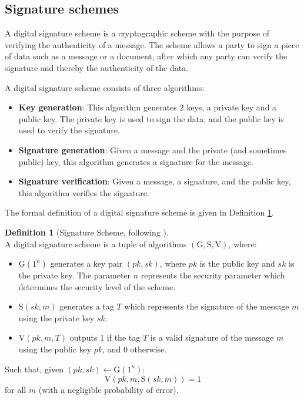 \documentclass[11pt,a4paper]{report}
\theoremstyle{definition}
\newtheorem{definition}{Definition}[section]
\begin{document}
\subsection{Signature schemes}
\label{sec:signatureschemes}
A digital signature scheme is a cryptographic scheme with the purpose of verifying the authenticity of a message. The scheme allows a party to sign a piece of data such as a message or a document, after which any party can verify the signature and thereby the authenticity of the data.

A digital signature scheme consists of three algorithms:
\begin{itemize}
  \item \textbf{Key generation}: This algorithm generates 2 keys, a private key and a public key. The private key is used to sign the data, and the public key is used to verify the signature.
  \item \textbf{Signature generation}: Given a message and the private (and sometimes public) key, this algorithm generates a signature for the message.
  \item \textbf{Signature verification}: Given a message, a signature, and the public key, this algorithm verifies the signature.
\end{itemize}
The formal definition of a digital signature scheme is given in Definition \ref{def:signaturescheme}.

\begin{definition}[Signature Scheme, following \cite{goldwasser2008lecture}]~\\
  \label{def:signaturescheme}
  A digital signature scheme is a tuple of algorithms $(\text{G}, \text{S}, \text{V})$, where:
  \begin{itemize}
    \item $\text{G}(1^n)$ generates a key pair $(pk, sk)$, where $pk$ is the public key and $sk$ is the private key. The parameter $n$ represents the security parameter which determines the security level of the scheme.
    \item $\text{S}(sk, m)$ generates a tag $T$ which represents the signature of the message $m$ using the private key $sk$.
    \item $\text{V}(pk, m, T)$ outputs 1 if the tag $T$ is a valid signature of the message $m$ using the public key $pk$, and 0 otherwise.
  \end{itemize}
  Such that, given $(pk, sk) \leftarrow \text{G}(1^n)$:
  \[
    \text{V}(pk, m, \text{S}(sk, m)) = 1
  \]
  for all $m$ (with a negligible probability of error).
\end{definition}
\end{document}
